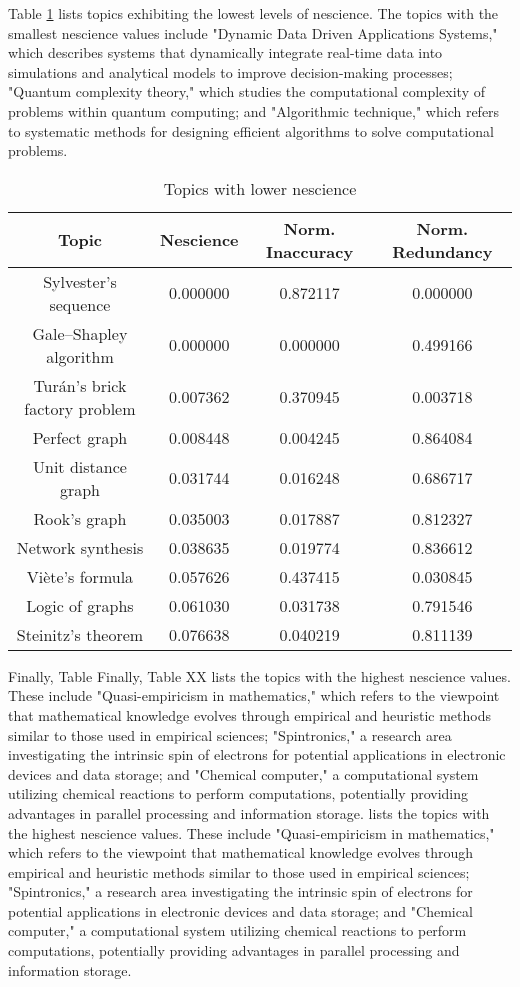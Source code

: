 Table \ref{tab:Lower-nescience-of-topics} lists topics exhibiting the lowest levels of nescience. The topics with the smallest nescience values include "Dynamic Data Driven Applications Systems," which describes systems that dynamically integrate real-time data into simulations and analytical models to improve decision-making processes; "Quantum complexity theory," which studies the computational complexity of problems within quantum computing; and "Algorithmic technique," which refers to systematic methods for designing efficient algorithms to solve computational problems.

\begin{table}
\begin{centering}
\begin{tabular}{|c|c|c|c|}
\hline 
Topic & Nescience & Norm. Inaccuracy & Norm. Redundancy \tabularnewline
\hline 
\hline
Sylvester's sequence & 0.000000 & 0.872117 & 0.000000 \tabularnewline
\hline
Gale–Shapley algorithm & 0.000000 & 0.000000 & 0.499166 \tabularnewline
\hline
Turán's brick factory problem & 0.007362 & 0.370945 & 0.003718 \tabularnewline
\hline
Perfect graph & 0.008448 & 0.004245 & 0.864084 \tabularnewline
\hline
Unit distance graph & 0.031744 & 0.016248 & 0.686717 \tabularnewline
\hline
Rook's graph & 0.035003 & 0.017887 & 0.812327 \tabularnewline
\hline
Network synthesis & 0.038635 & 0.019774 & 0.836612 \tabularnewline
\hline
Viète's formula & 0.057626 & 0.437415 & 0.030845 \tabularnewline
\hline
Logic of graphs & 0.061030 & 0.031738 & 0.791546 \tabularnewline
\hline
Steinitz's theorem & 0.076638 & 0.040219 & 0.811139 \tabularnewline
\hline 
\end{tabular}
\par\end{centering}
\caption{\label{tab:Lower-nescience-of-topics}Topics with lower nescience}
\end{table}

Finally, Table Finally, Table XX lists the topics with the highest nescience values. These include "Quasi-empiricism in mathematics," which refers to the viewpoint that mathematical knowledge evolves through empirical and heuristic methods similar to those used in empirical sciences; "Spintronics," a research area investigating the intrinsic spin of electrons for potential applications in electronic devices and data storage; and "Chemical computer," a computational system utilizing chemical reactions to perform computations, potentially providing advantages in parallel processing and information storage. lists the topics with the highest nescience values. These include "Quasi-empiricism in mathematics," which refers to the viewpoint that mathematical knowledge evolves through empirical and heuristic methods similar to those used in empirical sciences; "Spintronics," a research area investigating the intrinsic spin of electrons for potential applications in electronic devices and data storage; and "Chemical computer," a computational system utilizing chemical reactions to perform computations, potentially providing advantages in parallel processing and information storage.

